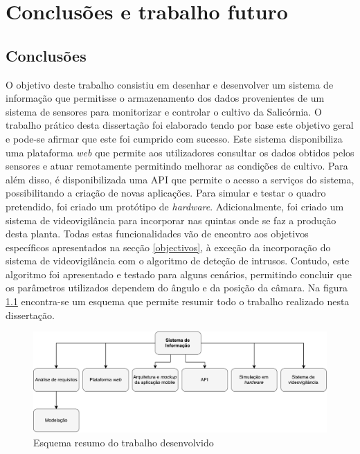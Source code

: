 \chapter{Conclusões e trabalho futuro}


\section{Conclusões}



O objetivo deste trabalho consistiu em desenhar e desenvolver um sistema de informação que permitisse o armazenamento dos dados provenientes de um sistema de sensores para monitorizar e controlar o cultivo da Salicórnia. O trabalho prático desta dissertação foi elaborado tendo por base este objetivo geral e pode-se afirmar que este foi cumprido com sucesso. Este sistema disponibiliza uma plataforma \textit{web} que permite aos utilizadores consultar os dados obtidos pelos sensores e atuar remotamente permitindo melhorar as condições de cultivo. Para além disso, é disponibilizada uma \ac{API} que permite o acesso a serviços do sistema, possibilitando a criação de novas aplicações. Para simular e testar o quadro pretendido, foi criado um protótipo de \textit{hardware}. Adicionalmente, foi criado um sistema de videovigilância para incorporar nas quintas onde se faz a produção desta planta. Todas estas funcionalidades vão de encontro aos objetivos específicos apresentados na secção \ref{objectivos}, à exceção da incorporação do sistema de videovigilância com o algoritmo de deteção de intrusos. Contudo, este algoritmo foi apresentado e testado para alguns cenários, permitindo concluir que os parâmetros utilizados dependem do ângulo e da posição da câmara.  Na figura \ref{resumo} encontra-se um esquema que permite resumir todo o trabalho realizado nesta dissertação. 

\begin{figure}[h]
	\centering
	\includegraphics[width=0.68\linewidth]{esquemas/conclusaofinal.pdf}
	\caption{Esquema resumo do trabalho desenvolvido}
	\label{resumo}
\end{figure}



